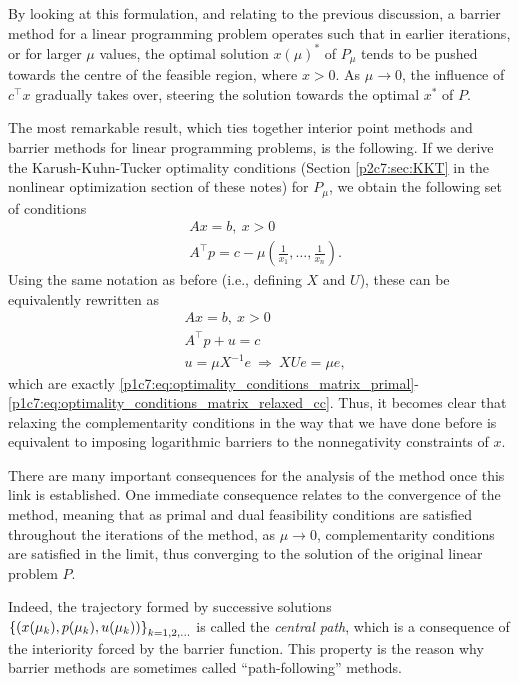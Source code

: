 By looking at this formulation, and relating to the previous discussion, a barrier method for a linear programming problem operates such that in earlier iterations, or for larger $\mu$ values, the optimal solution $x(\mu)^*$ of $P_\mu$ tends to be pushed towards the centre of the feasible region, where $x >0$. As $\mu \to 0$, the influence of $c^\top x$ gradually takes over, steering the solution towards the optimal $x^*$ of $P$. 

 The most remarkable result, which ties together interior point methods and barrier methods for linear programming problems, is the following. If we derive the Karush-Kuhn-Tucker optimality conditions (Section \ref{p2c7:sec:KKT} in the nonlinear optimization section of these notes) for $P_\mu$, we obtain the following set of conditions
	\begin{align*}
		&Ax = b, \ x > 0\\ 
		&A^\top p = c - \mu\left(\frac{1}{x_1},\dots,\frac{1}{x_n}\right).
	\end{align*}
	Using the same notation as before (i.e., defining $X$ and $U$), these can be equivalently rewritten as 
		\begin{align*}
			&Ax = b, \ x > 0 \\ 
			&A^\top p + u = c \\ 
			&u = \mu X^{-1}e ~\Rightarrow~ XUe = \mu e, 
		\end{align*}
	which are exactly \eqref{p1c7:eq:optimality_conditions_matrix_primal}-\eqref{p1c7:eq:optimality_conditions_matrix_relaxed_cc}. Thus, it becomes clear that relaxing the complementarity conditions in the way that we have done before is equivalent to imposing logarithmic barriers to the nonnegativity constraints of $x$. 
	
There are many important consequences for the analysis of the method once this link is established. One immediate consequence relates to the convergence of the method, meaning that as primal and dual feasibility conditions are satisfied throughout the iterations of the method, as $\mu \to 0$, complementarity conditions are satisfied in the limit, thus converging to the solution of the original linear problem $P$. 

Indeed, the trajectory formed by successive solutions $\left\{ (x(\mu_k), p(\mu_k), u(\mu_k)) \right \}_{k=1,2,\dots}$ is called the \emph{central path}, which is a consequence of the interiority forced by the barrier function. This property is the reason why barrier methods are sometimes called ``path-following'' methods.

